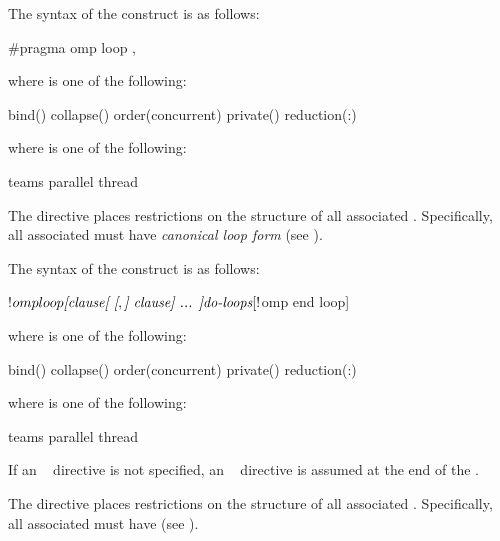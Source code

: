 \syntax
\begin{ccppspecific}
The syntax of the  construct is as follows:
\begin{ompcPragma}
#pragma omp loop \plc{[clause[ [},\plc{] clause] ... ] new-line}
\end{ompcPragma}

where  is one of the following:

\begin{indentedcodelist}
bind()
collapse()
order(concurrent)
private()
reduction(:)
\end{indentedcodelist}

where  is one of the following:
\begin{indentedcodelist}
  teams
  parallel
  thread
\end{indentedcodelist}

The  directive places restrictions on the structure of all associated .
Specifically, all associated  must have \emph{canonical loop form} (see
).
\end{ccppspecific}

\begin{fortranspecific}
The syntax of the  construct is as follows:

\begin{ompfPragma}
!$omp loop \plc{[clause[ [},\plc{] clause] ... ]}
   \plc{do-loops}
[!$omp end loop]
\end{ompfPragma}

\begin{samepage}
where  is one of the following:

\begin{indentedcodelist}
bind()
collapse()
order(concurrent)
private()
reduction(:)
\end{indentedcodelist}
\end{samepage}

where  is one of the following:
\begin{indentedcodelist}
  teams
  parallel
  thread
\end{indentedcodelist}

If an ~ directive is not specified, an
  ~ directive is assumed at the end of the
.

The  directive places restrictions on the structure of all
associated . Specifically, all associated  must
have  (see ).
\end{fortranspecific}

